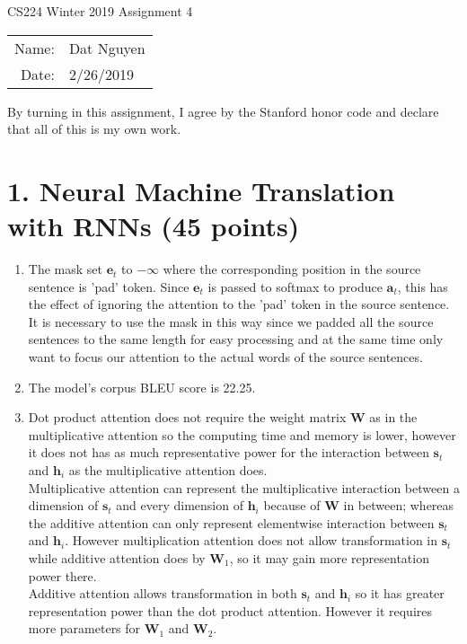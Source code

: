 \documentclass[12pt]{article}
\begin{document}
\begin{center}
{\Large CS224 Winter 2019 Assignment 4}

\begin{tabular}{rl}
Name: & Dat Nguyen \\
Date: & 2/26/2019 \\
\end{tabular}
\end{center}

By turning in this assignment, I agree by the Stanford honor code and declare
that all of this is my own work.

\section*{1. Neural Machine Translation with RNNs (45 points)}
\begin{enumerate}[label=(\alph*)]
  \addtocounter{enumi}{6}
  \item The mask set $\mathbf{e}_t$ to $-\infty$ where the corresponding position in the source sentence is 'pad' token. Since $\mathbf{e}_t$ is passed to softmax to produce $\mathbf{a}_t$, this has the effect of ignoring the attention to the 'pad' token in the source sentence. It is necessary to use the mask in this way since we padded all the source sentences to the same length for easy processing and at the same time only want to focus our attention to the actual words of the source sentences.
  \addtocounter{enumi}{1}
  \item
  The model's corpus BLEU score is 22.25.
  \item
  Dot product attention does not require the weight matrix $\mathbf{W}$ as in the multiplicative attention so the computing time and memory is lower, however it does not has as much representative power for the interaction between $\mathbf{s}_t$ and $\mathbf{h}_i$ as the multiplicative attention does. \\
  Multiplicative attention can represent the multiplicative interaction between a dimension of $\mathbf{s}_t$ and every dimension of $\mathbf{h}_i$ because of $\mathbf{W}$ in between; whereas the additive attention can only represent elementwise interaction between $\mathbf{s}_t$ and $\mathbf{h}_i$. However multiplication attention does not allow transformation in $\mathbf{s}_t$ while additive attention does by $\mathbf{W}_1$, so it may gain more representation power there. \\
  Additive attention allows transformation in both $\mathbf{s}_t$ and $\mathbf{h}_i$ so it has greater representation power than the dot product attention. However it requires more parameters for $\mathbf{W}_1$ and $\mathbf{W}_2$.
\end{enumerate}
\end{document}
